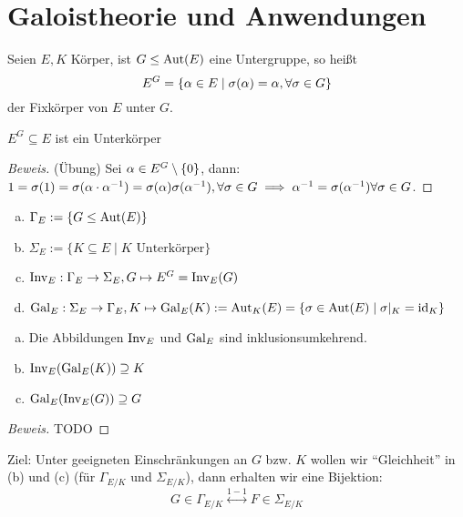 \documentclass[a4paper]{report}
\begin{document}
\section{Galoistheorie und Anwendungen}%
\begin{defi}[Fixkörper]
  Seien $E, K$ Körper, ist $G \le \operatorname{Aut}(E)$ eine Untergruppe, so heißt
  \[E^{G} = \{\alpha \in E \mid \sigma(\alpha) = \alpha,\forall \sigma \in G\}\]
  der Fixkörper von $E$ unter $G$.
\end{defi}
\begin{bem*} $E^{G} \subseteq E$ ist ein Unterkörper
\begin{proof}[Beweis] (Übung)
  Sei $\alpha \in E^{G} \setminus \{0\}$, dann: $1 = \sigma(1) = \sigma(\alpha \cdot \alpha^{-1}) = \sigma(\alpha)\sigma(\alpha^{-1}), \forall \sigma \in G \implies \alpha^{-1} = \sigma(\alpha^{-1}) \forall \sigma \in G$.
\end{proof}
\end{bem*}

\begin{defi}\item
\begin{enumerate}[(a)]
  \item $\Gamma_{E}:= \{G \le \operatorname{Aut}(E)\}$
  \item $\Sigma_{E}:= \{K \subseteq E \mid K \text{ Unterkörper}\}$
  \item $\operatorname{Inv}_{E}: \Gamma_{E} \to \Sigma_{E}, G \mapsto E^{G} = \operatorname{Inv}_{E}(G)$
  \item $\operatorname{Gal}_{E}: \Sigma_{E} \to \Gamma_{E}, K \mapsto \operatorname{Gal}_{E}(K) := \operatorname{Aut}_{K}(E) = \{\sigma \in \operatorname{Aut}(E) \mid \sigma|_{K} = \operatorname{id}_{K}\}$
\end{enumerate}
\end{defi}

\begin{lemm}
\begin{enumerate}[(a)]
  \item Die Abbildungen $\operatorname{Inv}_{E}$ und $\operatorname{Gal}_{E}$ sind inklusionsumkehrend.
  \item $\operatorname{Inv}_{E}(\operatorname{Gal}_{E}(K)) \supseteq K$
\item $\operatorname{Gal}_{E}(\operatorname{Inv}_{E}(G)) \supseteq G$
\end{enumerate}
\begin{proof}[Beweis]
TODO
\end{proof}
\end{lemm}

\begin{bem*}
  Ziel: Unter geeigneten Einschränkungen an $G$ bzw. $K$ wollen wir ``Gleichheit'' in (b) und (c) (für $\Gamma_{E / K}$ und $\Sigma_{E / K}$), dann erhalten wir eine Bijektion: \[G \in \Gamma_{E / K}\overset{1-1} \longleftrightarrow F \in \Sigma_{E/K}\]
\end{bem*}
\end{document}
